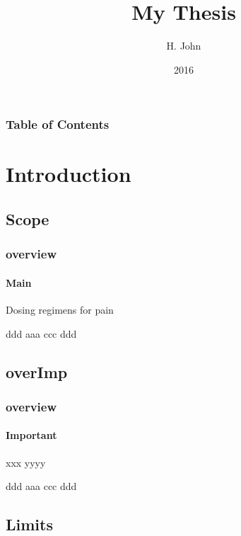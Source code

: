 \documentclass{beamer}
\title[]{My Thesis}
\subtitle{}
\author[]{H. John}
\date{2016}
\begin{document}
\begin{frame}
    \titlepage
\end{frame} 

\begin{frame}[t,allowframebreaks]
    \frametitle{Table of Contents}
    \tableofcontents
\end{frame}

\section[Int]{Introduction}
\frame{\sectionpage}

\subsection[Scope]{Scope}
\frame{\subsectionpage}

\begin{frame}[fragile,t,shrink=6]
    \frametitle{overview}
    \framesubtitle{Main}

    \begin{center}
        \color{blue}
        Dosing regimens for pain
    \end{center}

    ddd aaa ccc ddd
\end{frame} 

\subsection*{overImp}
\begin{frame}[fragile,t,shrink=6]
    \frametitle{overview}
    \framesubtitle{Important}

    \begin{center}
         \color{blue}
            xxx yyyy
    \end{center}

    ddd aaa ccc ddd
\end{frame}

\subsection[Lim]{Limits}
\frame{\subsectionpage}
\end{document}
